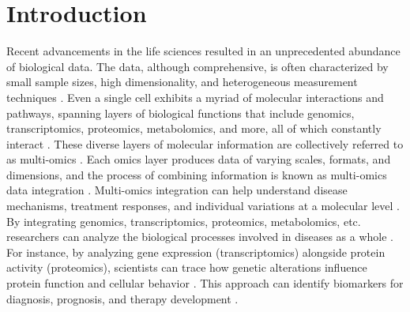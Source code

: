 \documentclass[unnumsec,webpdf,modern,large]{oup-authoring-template}
\theoremstyle{thmstyleone}%
\theoremstyle{thmstyletwo}%
\theoremstyle{thmstylethree}%
\begin{document}
\section{Introduction}
Recent advancements in the life sciences resulted in an unprecedented abundance of biological data. The data, although comprehensive, is often characterized by small sample sizes, high dimensionality, and heterogeneous measurement techniques \cite{misra2019integrated}. Even a single cell exhibits a myriad of molecular interactions and pathways, spanning layers of biological functions that include genomics, transcriptomics, proteomics, metabolomics, and more, all of which constantly interact \cite{aranda2010intact, cordell2009detecting}. These diverse layers of molecular information are collectively referred to as multi-omics \cite{vailati2017omics}. Each omics layer produces data of varying scales, formats, and dimensions, and the process of combining information is known as multi-omics data integration \cite{athieniti2022guide, Bouhaddani2023, subramanian2020multi}. Multi-omics integration can help understand disease mechanisms, treatment responses, and individual variations at a molecular level \cite{dihazi2018integrative}. By integrating genomics, transcriptomics, proteomics, metabolomics, etc. researchers can analyze the biological processes involved in diseases as a whole \cite{Hasin2017, duan2021evaluation}. For instance, by analyzing gene expression (transcriptomics) alongside protein activity (proteomics), scientists can trace how genetic alterations influence protein function and cellular behavior \cite{guil2015rna}. This approach can identify biomarkers for diagnosis, prognosis, and therapy development \cite{hann2001molecular, karczewski2018integrative, mendez2017many}.
\end{document}

